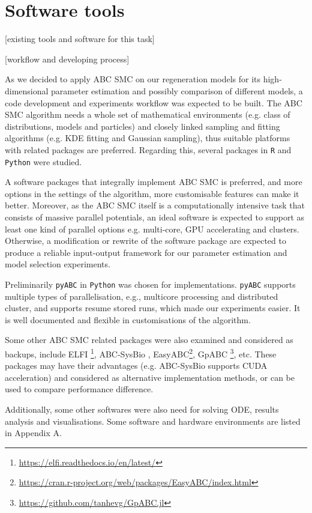 \section{Software tools}

 [existing tools and software for this task]

 [workflow and developing process]

 As we decided to apply ABC SMC on our regeneration models for its high-dimensional parameter estimation and possibly comparison of different models, a code development and experiments workflow was expected to be built. The ABC SMC algorithm needs a whole set of mathematical environments (e.g. class of distributions, models and particles) and closely linked sampling and fitting algorithms (e.g. KDE fitting and Gaussian sampling), thus suitable platforms with related packages are preferred. Regarding this, several packages in \verb|R| and \verb|Python| were studied.

 A software packages that integrally implement ABC SMC is preferred, and more options in the settings of the algorithm, more customisable features can make it better. Moreover, as the ABC SMC itself is a computationally intensive task that consists of massive parallel potentials, an ideal software is expected to support as least one kind of parallel options e.g. multi-core, GPU accelerating and clusters. Otherwise, a modification or rewrite of the software package are expected to produce a reliable input-output framework for our parameter estimation and model selection experiments.

 Preliminarily \verb|pyABC| \cite{ref:pyabc} in \verb|Python| was chosen for implementations. \verb|pyABC| supports multiple types of parallelisation, e.g., multicore processing and distributed cluster, and supports resume stored runs, which made our experiments easier. It is well documented and flexible in customisations of the algorithm.

 Some other ABC SMC related packages were also examined and considered as backups, include ELFI \footnote{\url{https://elfi.readthedocs.io/en/latest/}}, ABC-SysBio \cite{ref:abcsysbio}, EasyABC\footnote{\url{https://cran.r-project.org/web/packages/EasyABC/index.html}}, GpABC \footnote{\url{https://github.com/tanhevg/GpABC.jl}}, etc. These packages may have their advantages (e.g. ABC-SysBio supports CUDA acceleration) and considered as alternative implementation methods, or can be used to compare performance difference.

 Additionally, some other softwares were also need for solving ODE, results analysis and visualisations. Some software and hardware environments are listed in Appendix A.